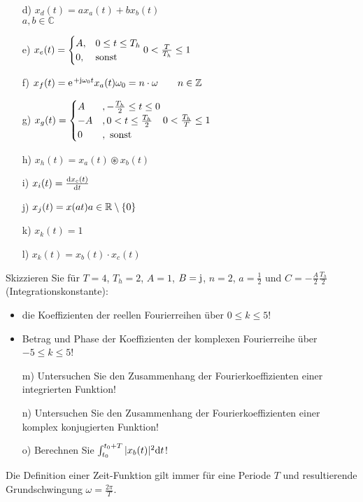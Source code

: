 \documentclass[11pt,a4paper,DIV=12]{scrartcl}
\begin{document}
\begin{itemize}
	\item[d) ] $x_d(t) = ax_{a}(t)+bx_{b}(t)$\\
				$a,b\in\mathbb{C}$
	\item[e) ] $x_{e}(t)=
				\begin{cases}
					A, &0\leq t\leq T_h\\
					0, &\text{sonst}
				\end{cases}\\
				0< \frac{T}{T_h}\leq 1$
	\item[f) ] $x_{f}(t)=\e^{+\im\omega_0 t}x_{a}(t)\\
			  	\omega_0 = n\cdot \omega \quad \quad n\in\mathbb{Z}$
	\item[g) ] $x_{g}(t) =
				\begin{cases}
					A &, -\frac{T_h}{2}\leq t \leq 0 \\
					-A &, 0<t\leq \frac{T_h}{2}\\
					0 &,\text{ sonst}
				\end{cases}\\
				0<\frac{T_h}{T}\leq 1$
	\item[h) ] $x_{h}(t) = x_{a}(t)\circledast x_{b}(t)$
	\item[i) ]$x_{i}(t)=\frac{\mathrm{d} x_{c}(t)}{\mathrm{d} t}$
	\item[j) ] $x_{j}(t)=x(at)\\
				a\in\mathbb{R}\setminus\{0\}$
	\item[k) ]$x_{k}(t)=1$
	\item[l) ] $x_{k}(t)=x_{b}(t)\cdot x_{c}(t)$
\end{itemize}
%
Skizzieren Sie für $T=4$, $T_h=2$, $A=1$, $B=\im$, $n= 2$, $a=\frac{1}{2}$ und $C=-\frac{A}{2}\frac{T_h}{2}$ (Integrationskonstante):
%
\begin{itemize}
	\item die Koeffizienten der reellen Fourierreihen über $0\leq k \leq 5$!
	\item Betrag und Phase der Koeffizienten der komplexen Fourierreihe über
	$-5\leq k \leq 5$!
\end{itemize}
%
\begin{itemize}
	\item[m) ] Untersuchen Sie den Zusammenhang der Fourierkoeffizienten einer
	integrierten Funktion!
	\item[n) ] Untersuchen Sie den Zusammenhang der Fourierkoeffizienten einer
	komplex konjugierten Funktion!
	\item[o) ] Berechnen Sie $\int_{t_0}^{t_0+T}|x_b(t)|^2\mathrm{d} t$!
\end{itemize}
%
Die Definition einer Zeit-Funktion gilt immer für eine Periode $T$ und resultierende
Grundschwingung $\omega = \frac{2\pi}{T}$.
\end{document}
